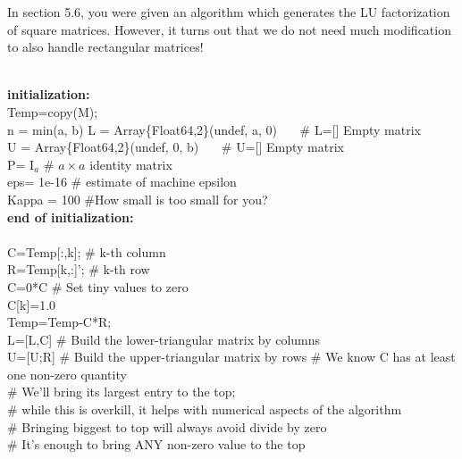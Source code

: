 In section 5.6, you were given an algorithm which generates the LU factorization of square matrices. However, it turns out that we do not need much modification to also handle rectangular matrices!
 
 \begin{tcolorbox}[sharp corners, colback=green!30, colframe=green!80!blue, title=\textbf{\Large LU Factorization of Matrices}]
 \begin{algorithm}[H]
\SetAlgoLined
{}
\mbox{} \\
 \textbf{initialization:}\\
 {\rm Temp}=copy(M); \\
 n = min(a, b)
L = Array\{Float64,2\}(undef, a, 0)  ~~~\# L=[] Empty matrix\\
U = Array\{Float64,2\}(undef, 0, b)  ~~~\# U=[] Empty matrix\\
 P= I$_a$ \# $a \times a$ identity matrix\\
 eps= 1e-16 \# estimate of machine epsilon \\
 Kappa = 100  \#How small is too small for you?\\
  \textbf{end of initialization:}\\
\mbox{}  \\
 {
    C=Temp[:,k]; \# k-th column\\
    R={\rm Temp}[k,:]'; \# k-th row\\
  { 
      C=0*C \# Set tiny values to zero\\
      C[k]=1.0 \\
    {\rm Temp}={\rm Temp}-C*R; \\
     L=[L,C]  \# Build the lower-triangular matrix by columns\\
    U=[U;R] \# Build the upper-triangular matrix by rows
   }
   {
   \# We know C has at least one non-zero quantity \\ 
    \# We'll bring its largest entry to the top; \\
    \# while this is overkill, it helps with numerical aspects of the algorithm \\
    \# Bringing biggest to top will always avoid divide by zero \\
    \# It's enough to bring ANY non-zero value to the top \\
}}
\end{algorithm}
\end{tcolorbox}
